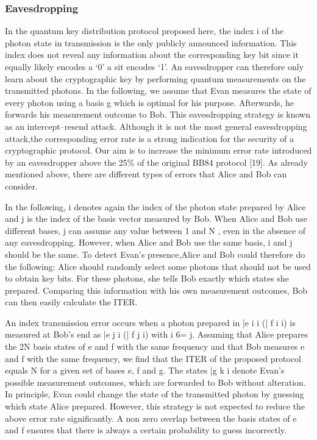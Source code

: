 \subsubsection{Eavesdropping}

In the quantum key distribution protocol proposed here, the index i of the photon state in transmission is the only publicly announced information. This index does not reveal any information about the corresponding key bit since it equally likely encodes a ‘0’ a sit encodes ‘1’. An eavesdropper can therefore only learn about the cryptographic key by performing quantum measurements on the transmitted photons. In the following, we assume that Evan measures the state of every photon using a basis g which is optimal for his purpose. Afterwards, he forwards his measurement outcome to Bob. This eavesdropping strategy is known as an intercept–resend attack. Although it is not the most general eavesdropping attack,the corresponding error rate is a strong indication for the security of a cryptographic protocol. Our aim is to increase the minimum error rate introduced by an eavesdropper above the 25\% of the original BB84 protocol [19]. As already mentioned above, there are different types of errors that Alice and Bob can consider.

In the following, i denotes again the index of the photon state prepared by Alice and j is the index of the basis vector measured by Bob. When Alice and Bob use different bases, j can assume any value between 1 and N , even in the absence of any eavesdropping. However, when Alice and Bob use the same basis, i and j should be the same. To detect Evan’s presence,Alice and Bob could therefore do the following: Alice should randomly select some photons that should not be used to obtain key bits. For these photons, she tells Bob exactly which states she prepared. Comparing this information with his own measurement outcomes, Bob can then easily calculate the ITER.

An index transmission error occurs when a photon prepared in |e i i (| f i i) is measured at Bob’s end as |e j i (| f j i) with i 6= j. Assuming that Alice prepares the 2N basis states of e and f with the same frequency and that Bob measures e and f with the same frequency, we find that the ITER of the proposed protocol equals N for a given set of bases e, f and g. The states |g k i denote Evan’s possible measurement outcomes, which are forwarded to Bob without alteration. In principle, Evan could change the state of the transmitted photon by guessing which state Alice prepared. However, this strategy is not expected to reduce the above error rate significantly. A non zero overlap between the basis states of e and f ensures that there is always a certain probability to guess incorrectly.

